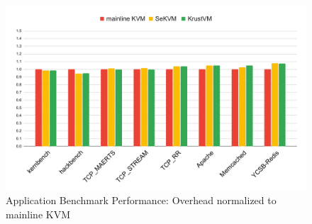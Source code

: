 \begin{figure}[hbtp]
    \includegraphics[scale=0.45]{figures/eval2.pdf}
    \caption{Application Benchmark Performance: Overhead normalized to mainline KVM}
    \label{fig:eval2}
\end{figure}
